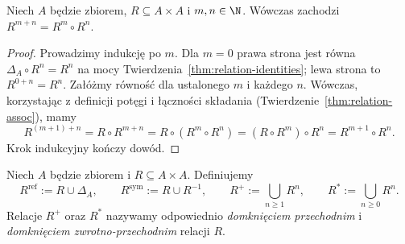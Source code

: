 \begin{lemat}
\label{lem:relation-powers}
Niech $A$ będzie zbiorem, $R\subseteq A\times A$
i $m,n\in\N$. Wówczas zachodzi $R^{m+n}=R^m\circ R^n$.
\end{lemat}
\begin{proof}
Prowadzimy indukcję po $m$. Dla $m=0$ prawa strona
jest równa $\Delta_A\circ R^n=R^n$ na mocy
Twierdzenia~\ref{thm:relation-identities}; lewa strona
to $R^{0+n}=R^n$. Załóżmy równość dla ustalonego $m$
i każdego $n$. Wówczas, korzystając z definicji potęgi
i łączności składania
(Twierdzenie~\ref{thm:relation-assoc}), mamy
\[
R^{(m+1)+n}=R\circ R^{m+n}
=R\circ(R^m\circ R^n)
=(R\circ R^m)\circ R^n=R^{m+1}\circ R^n.
\]
Krok indukcyjny kończy dowód.
\end{proof}

\begin{definicja}
\label{def:relation-closure}
Niech $A$ będzie zbiorem i $R\subseteq A\times A$.
Definiujemy
\[
R^{\mathrm{ref}}:=R\cup\Delta_A,\qquad
R^{\mathrm{sym}}:=R\cup R^{-1},\qquad
R^+:=\bigcup_{n\ge1}R^n,\qquad
R^*:=\bigcup_{n\ge0}R^n.
\]
Relacje $R^+$ oraz $R^*$ nazywamy odpowiednio
\emph{domknięciem przechodnim} i
\emph{domknięciem zwrotno-przechodnim} relacji $R$.
\end{definicja}

